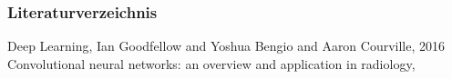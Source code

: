 \documentclass{beamer}
\begin{document}
%
%

\begin{frame}
\frametitle{Literaturverzeichnis}
\begin{scriptsize}
\begin{thebibliography}{1}
 Deep Learning, Ian Goodfellow and Yoshua Bengio and Aaron Courville, 2016
 Convolutional neural networks: an overview and application in radiology, 
\end{thebibliography}
\end{scriptsize}

\end{frame}




\end{document}
